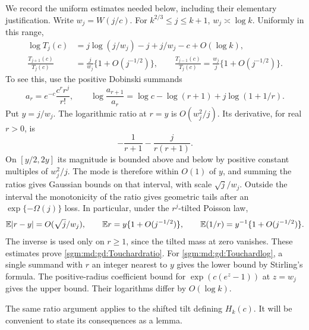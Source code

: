 \documentclass[11pt,letterpaper]{article}
\theoremstyle{remark}\newtheorem{remark}[theorem]{Remark}
\theoremstyle{definition}\newtheorem{definition}[theorem]{Definition}
\begin{document}
We record the uniform estimates needed below, including their elementary
justification.  Write $w_j=W(j/c)$.  For $k^{2/3}\le j\le k+1$,
$w_j\asymp\log k$.  Uniformly in this range,
\begin{align}
 \log T_j(c)
 &=j\log(j/w_j)-j+j/w_j-c+O(\log k),\label{sgm:md:gd:Touchardlog}\\
 \frac{T_{j+1}(c)}{T_j(c)}
 &=\frac{j}{w_j}\{1+O(j^{-1/2})\},\qquad
 \frac{T_{j-1}(c)}{T_j(c)}
 =\frac{w_j}{j}\{1+O(j^{-1/2})\}.\label{sgm:md:gd:Touchardratio}
\end{align}
To see this, use the positive Dobinski summands
\[
 a_r=e^{-c}\frac{c^r r^j}{r!},\qquad
 \log\frac{a_{r+1}}{a_r}
 =\log c-\log(r+1)+j\log(1+1/r).
\]
Put $y=j/w_j$.  The logarithmic ratio at $r=y$ is $O(w_j^2/j)$.
Its derivative, for real $r>0$, is
\[
 -\frac1{r+1}-\frac{j}{r(r+1)}.
\]
On $[y/2,2y]$ its magnitude is bounded above and below by positive
constant multiples of $w_j^2/j$.  The mode is therefore within $O(1)$
of $y$, and summing the ratios gives Gaussian bounds on that interval,
with scale $\sqrt{j}/w_j$.  Outside the interval the monotonicity of the
ratio gives geometric tails after an $\exp\{-\Omega(j)\}$ loss.
In particular, under the $r^j$-tilted Poisson law,
\[
 \mathbb E|r-y|=O(\sqrt{j}/w_j),\qquad
 \mathbb E r=y\{1+O(j^{-1/2})\},\qquad
 \mathbb E(1/r)=y^{-1}\{1+O(j^{-1/2})\}.
\]
The inverse is used only on $r\ge1$, since the tilted mass at zero
vanishes.  These estimates prove \eqref{sgm:md:gd:Touchardratio}.
For \eqref{sgm:md:gd:Touchardlog}, a single summand with $r$ an integer nearest
to $y$ gives the lower bound by Stirling's formula.  The positive-radius
coefficient bound for $\exp(c(e^z-1))$ at $z=w_j$ gives the upper bound.
Their logarithms differ by $O(\log k)$.

The same ratio argument applies to the shifted tilt defining $H_k(c)$.
It will be convenient to state its consequences as a lemma.
\end{document}

